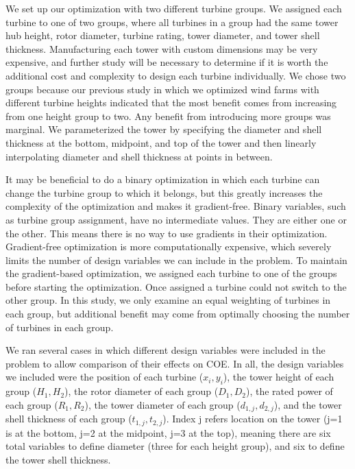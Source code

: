 We set up our optimization with two different turbine groups. We assigned each turbine to one of two groups, where all turbines in a group had the same tower hub height, rotor diameter, turbine rating, tower diameter, and tower shell thickness. Manufacturing each tower with custom dimensions may be very expensive, and further study will be necessary to determine if it is worth the additional cost and complexity to design each turbine individually. We chose two groups because our previous study in which we optimized wind farms with different turbine heights indicated that the most benefit comes from increasing from one height group to two. Any benefit from introducing more groups was marginal\cite{stanley2018}. We parameterized the tower by specifying the diameter and shell thickness at the bottom, midpoint, and top of the tower and then linearly interpolating diameter and shell thickness at points in between. 
        
        It may be beneficial to do a binary optimization in which each turbine can change the turbine group to which it belongs, but this greatly increases the complexity of the optimization and makes it gradient-free. Binary variables, such as turbine group assignment, have no intermediate values. They are either one or the other. This means there is no way to use gradients in their optimization. Gradient-free optimization is more computationally expensive, which severely limits the number of design variables we can include in the problem. To maintain the gradient-based optimization, we assigned each turbine to one of the groups before starting the optimization. Once assigned a turbine could not switch to the other group. In this study, we only examine an equal weighting of turbines in each group, but additional benefit may come from optimally choosing the number of turbines in each group.%
        
        We ran several cases in which different design variables were included in the problem to allow comparison of their effects on COE. In all, the design variables we included were the position of each turbine ($x_i,y_i$), the tower height of each group ($H_1, H_2$), the rotor diameter of each group ($D_1, D_2$), the rated power of each group ($R_1, R_2$), the tower diameter of each group ($d_{1,j}, d_{2,j}$), and the tower shell thickness of each group ($t_{1,j}, t_{2,j}$). Index j refers location on the tower (j=1 is at the bottom, j=2 at the midpoint, j=3 at the top), meaning there are six total variables to define diameter (three for each height group), and six to define the tower shell thickness.
                

